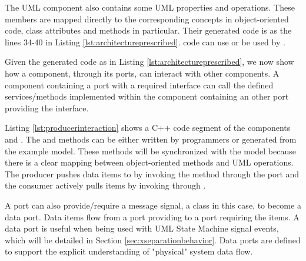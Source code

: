 \begin{minipage}{\columnwidth}
	
\end{minipage}


The UML  component also contains some UML properties and operations.
These members are mapped directly to the corresponding concepts in object-oriented code, class attributes and methods in particular.
Their generated code is  as the lines 34-40 in Listing \ref{lst:architectureprescribed}.
 code can use or be used by .

\vskip 0.1cm
\noindent
{} Given the generated code as in Listing \ref{lst:architectureprescribed}, we now show how a component, through its ports, can interact with other components.
A component containing a port with a required interface can call the defined services/methods implemented within the component containing an other port providing the interface.

Listing \ref{lst:producerinteraction} shows a C++ code segment of the components  and .
The  and  methods can be either written by programmers or generated from the example model.
These methods will be synchronized with the model because there is a clear mapping between object-oriented methods and UML operations.
The producer pushes data items to  by invoking the  method through the  port and the consumer actively pulls items by invoking  through .

\begin{minipage}{\columnwidth}
	
\end{minipage}
 
\vskip 0.1cm
\noindent
{} 
A port can also provide/require a message signal, a class in this case, to become a data port.
Data items flow from a port providing to a port requiring the items.
A data port is useful when being used with UML State Machine signal events, which will be detailed in Section \ref{sec:xseparationbehavior}.
Data ports are defined to support the explicit understanding of "physical" system data flow. 

